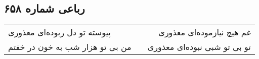 \begin{center}
\section*{رباعی شماره ۶۵۸}
\label{sec:sh658}
\begin{longtable}{l p{0.5cm} r}
پیوسته تو دل ربوده‌ای معذوری
&&
غم هیچ نیازموده‌ای معذوری
\\
من بی تو هزار شب به خون در خفتم
&&
تو بی تو شبی نبوده‌ای معذوری
\\
\end{longtable}
\end{center}
